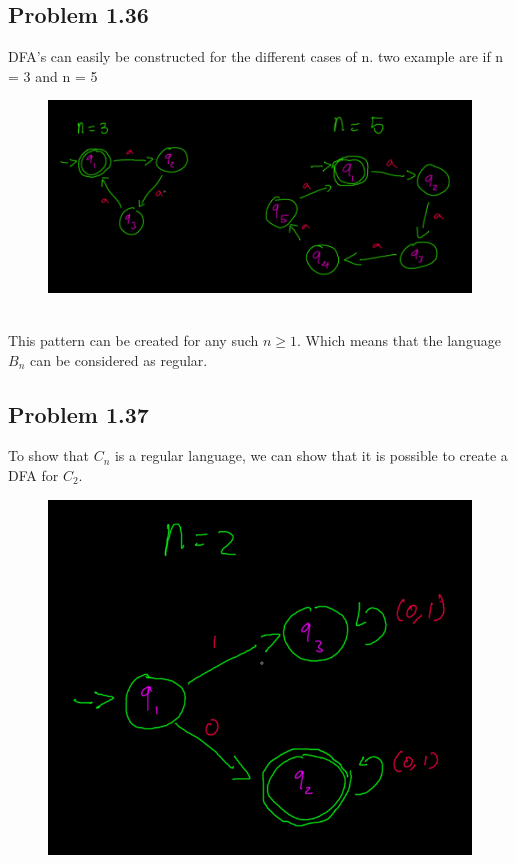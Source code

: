 \documentclass[letter]{article}
\theoremstyle{case}
\begin{document}
\subsection*{Problem 1.36}
DFA's can easily be constructed for the different cases of n. two example are if n = 3 and n = 5 \\
\begin{figure}[h!]
	\includegraphics[scale=0.4]{36.png}
\end{figure} \\ 
This pattern can be created for any such $n \geq 1$. Which means that the language $B_n$ can be considered as regular.
\subsection*{Problem 1.37}
To show that $C_n$ is a regular language, we can show that it is possible to create a DFA for $C_2$. \\
\begin{figure}[h!]
	\includegraphics[scale=0.4]{37.png}
\end{figure} \\
\newpage
\end{document}
